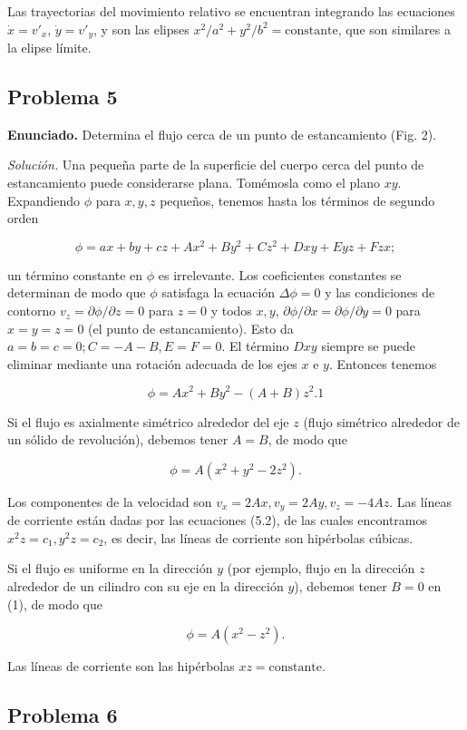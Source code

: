 \documentclass{article}
\begin{document}
Las trayectorias del movimiento relativo se encuentran integrando las ecuaciones $\dot{x} = v'_x$, $\dot{y} = v'_y$, y son las elipses $x^2/a^2 + y^2/b^2 = \text{constante}$, que son similares a la elipse límite.

\subsection*{Problema 5}

\textbf{Enunciado.} Determina el flujo cerca de un punto de estancamiento (Fig. 2).

\textit{Solución.} Una pequeña parte de la superficie del cuerpo cerca del punto de estancamiento puede considerarse plana. Tomémosla como el plano $xy$. Expandiendo $\phi$ para $x, y, z$ pequeños, tenemos hasta los términos de segundo orden

$$
\phi = ax + by + cz + Ax^2 + By^2 + Cz^2 + Dxy + Eyz + Fzx;
$$

un término constante en $\phi$ es irrelevante. Los coeficientes constantes se determinan de modo que $\phi$ satisfaga la ecuación $\Delta \phi = 0$ y las condiciones de contorno $v_z = \partial \phi/\partial z = 0$ para $z = 0$ y todos $x, y$, $\partial \phi/\partial x = \partial \phi/\partial y = 0$ para $x = y = z = 0$ (el punto de estancamiento). Esto da $a = b = c = 0; C = -A - B, E = F = 0$. El término $Dxy$ siempre se puede eliminar mediante una rotación adecuada de los ejes $x$ e $y$. Entonces tenemos

$$
\phi = Ax^2 + By^2 - (A + B)z^2. {1}
$$

Si el flujo es axialmente simétrico alrededor del eje $z$ (flujo simétrico alrededor de un sólido de revolución), debemos tener $A = B$, de modo que

$$
\phi = A(x^2 + y^2 - 2z^2).
$$

Los componentes de la velocidad son $v_x = 2Ax, v_y = 2Ay, v_z = -4Az$. Las líneas de corriente están dadas por las ecuaciones (5.2), de las cuales encontramos $x^2z = c_1, y^2z = c_2$, es decir, las líneas de corriente son hipérbolas cúbicas.

Si el flujo es uniforme en la dirección $y$ (por ejemplo, flujo en la dirección $z$ alrededor de un cilindro con su eje en la dirección $y$), debemos tener $B = 0$ en (1), de modo que

$$
\phi = A(x^2 - z^2).
$$

Las líneas de corriente son las hipérbolas $xz = \text{constante}$.

\subsection*{Problema 6}
\end{document}
